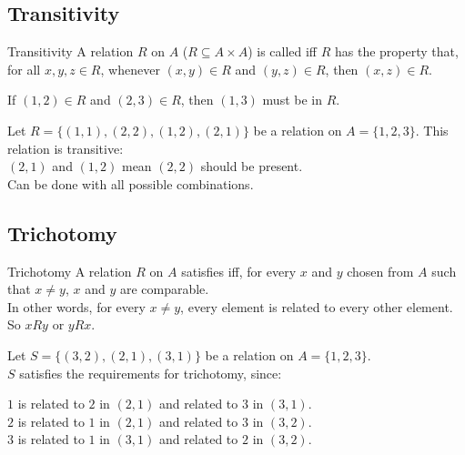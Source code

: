 \documentclass[../notes.tex]{subfiles}
\begin{document}
			\subsection{Transitivity}
				\begin{definition}{Transitivity}
					A relation $R$ on $A$ ($R \subseteq A \times A$) is called  iff $R$ has the property that, for all $x, y, z \in R$, whenever $(x, y) \in R$ and $(y, z) \in R$, then $(x, z) \in R$.
				\end{definition}
				\begin{example}[hbox]
					If $(1, 2) \in R$ and $(2, 3) \in R$, then $(1, 3)$ must be in $R$.
				\end{example}
				\begin{example}
					Let $R = \bigl\{(1, 1), (2, 2), (1, 2), (2, 1)\bigr\}$ be a relation on $A = \{1, 2, 3\}$. This relation is transitive:\\
					$(2, 1)$ and $(1, 2)$ mean $(2, 2)$ should be present.\\
					Can be done with all possible combinations.
				\end{example}
			\pagebreak
			\subsection{Trichotomy}
				\begin{definition}{Trichotomy}
					A relation $R$ on $A$ satisfies  iff, for every $x$ and $y$ chosen from $A$ such that $x \neq y$, $x$ and $y$ are comparable.\\
					In other words, for every $x \neq y$, every element is related to every other element. So $x R y$ or $y R x$.
				\end{definition}
				\begin{example}[width=0.75\textwidth]
					Let $S = \bigl\{(3, 2), (2, 1), (3, 1)\bigr\}$ be a relation on $A = \{1, 2, 3\}$.\\
					$S$ satisfies the requirements for trichotomy, since:
					\begin{indentparagraph}
						$1$ is related to $2$ in $(2, 1)$ and related to $3$ in $(3, 1)$.\\
						$2$ is related to $1$ in $(2, 1)$ and related to $3$ in $(3, 2)$.\\
						$3$ is related to $1$ in $(3, 1)$ and related to $2$ in $(3, 2)$.
					\end{indentparagraph}
				\end{example}
\end{document}
